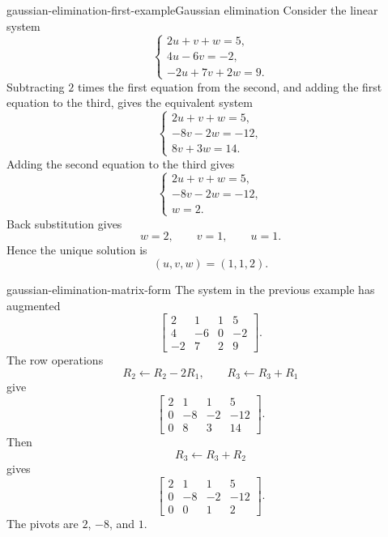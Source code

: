 \documentclass[preview]{standalone}
\begin{document}
\begin{snippetexample}{gaussian-elimination-first-example}{Gaussian elimination}
    Consider the linear system
    \[
        \begin{cases}
            2u+v+w=5,\\
            4u-6v=-2,\\
            -2u+7v+2w=9.
        \end{cases}
    \]
    Subtracting \(2\) times the first equation from the second, and adding
    the first equation to the third, gives the equivalent system
    \[
        \begin{cases}
            2u+v+w=5,\\
            -8v-2w=-12,\\
            8v+3w=14.
        \end{cases}
    \]
    Adding the second equation to the third gives
    \[
        \begin{cases}
            2u+v+w=5,\\
            -8v-2w=-12,\\
            w=2.
        \end{cases}
    \]
    Back substitution gives
    \[
        w=2,
        \qquad
        v=1,
        \qquad
        u=1.
    \]
    Hence the unique solution is
    \[
        (u,v,w)=(1,1,2).
    \]
\end{snippetexample}

\begin{snippet}{gaussian-elimination-matrix-form}
    The system in the previous example has augmented \matrix
    \[
        \left[
            \begin{array}{ccc|c}
                2 & 1 & 1 & 5\\
                4 & -6 & 0 & -2\\
                -2 & 7 & 2 & 9
            \end{array}
        \right].
    \]
    The row operations
    \[
        R_2\leftarrow R_2-2R_1,
        \qquad
        R_3\leftarrow R_3+R_1
    \]
    give
    \[
        \left[
            \begin{array}{ccc|c}
                2 & 1 & 1 & 5\\
                0 & -8 & -2 & -12\\
                0 & 8 & 3 & 14
            \end{array}
        \right].
    \]
    Then
    \[
        R_3\leftarrow R_3+R_2
    \]
    gives
    \[
        \left[
            \begin{array}{ccc|c}
                2 & 1 & 1 & 5\\
                0 & -8 & -2 & -12\\
                0 & 0 & 1 & 2
            \end{array}
        \right].
    \]
    The pivots are \(2\), \(-8\), and \(1\).
\end{snippet}
\end{document}
